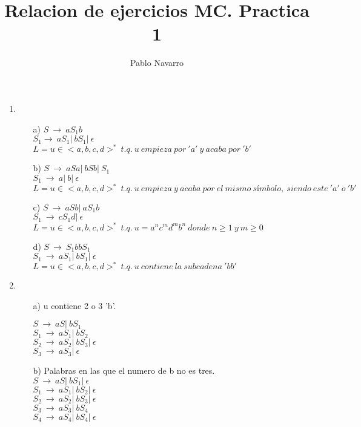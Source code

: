 \documentclass{article}
\begin{document}
\title{Relacion de ejercicios MC. Practica 1}
\author{Pablo Navarro}
\maketitle
\begin{enumerate}
  \item{}         %
  \begin{itemize}
    \item[a)]
    $ S\ \rightarrow\ aS_{1}b $ \\
    $ S_{1} \rightarrow\ aS_{1} |\ bS_{1} |\ \epsilon $\\
    $ L = u \in <a,b,c,d>^*\ t.q.\ u\ empieza\ por\ 'a'\ y\ acaba\ por\ 'b' $
  \item[b)]
    $ S\ \rightarrow\ aSa |\ bSb |\ S_{1} $\\
    $ S_{1}\ \rightarrow\ a |\ b |\ \epsilon $\\
    $ L  = u \in <a,b,c,d>^*\ t.q.\ u\ empieza\ y\ acaba\ por\ el\ mismo\
    símbolo,\ siendo\ este\ 'a'\ o\ 'b' $
  \item[c)]
    $ S\ \rightarrow\ aSb |\ aS_{1}b $ \\
    $ S_{1}\ \rightarrow\ cS_{1}d |\ \epsilon $\\
    $ L = u \in <a,b,c,d>^*\ t.q.\ u = a^{n}c^{m}d^{m}b^{n}\ donde\ n \geq 1\ y\ m \geq 0  $
  \item[d)]
    $ S\ \rightarrow\ S_{1}bbS_{1} $ \\
    $ S_{1}\ \rightarrow\ aS_{1} |\ bS_{1} |\ \epsilon $ \\
    $ L = u \in <a,b,c,d>^*\ t.q. \ u\ contiene\ la\ subcadena\ 'bb' $
    \end{itemize}
  \item{}         %
  \begin{itemize}
    \item[ a)] u contiene 2 o 3 'b'.

    $ S\ \rightarrow\ aS |\ bS_{1} $\\
    $ S_{1}\ \rightarrow\ aS_{1} |\ bS_{2} $\\
    $ S_{2}\ \rightarrow\ aS_{2} |\ bS_{3}  |\ \epsilon $\\
    $ S_{3}\ \rightarrow\ aS_{3} |\ \epsilon $\\

    \item[b)] Palabras en las que el numero de b no es tres.\\
    $ S\ \rightarrow\ aS |\ bS_{1} |\ \epsilon $\\
    $ S_{1}\ \rightarrow\ aS_{1} |\ bS_{2} |\ \epsilon $\\
    $ S_{2}\ \rightarrow\ aS_{2} |\ bS_{3} |\ \epsilon $\\
    $ S_{3}\ \rightarrow\ aS_{3} |\ bS_{4} $\\
    $ S_{4}\ \rightarrow\ aS_{4} |\ bS_{4} |\ \epsilon $


\end{itemize}
\end{enumerate}
\end{document}
